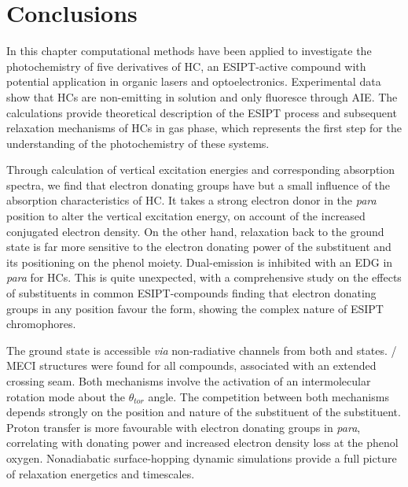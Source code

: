 \section{Conclusions}\label{section: NRdecay_Conclusions}
In this chapter computational methods have been applied to investigate the photochemistry of five derivatives of \ac{HC}, an ESIPT-active compound with potential application in organic lasers and optoelectronics. Experimental data show that \ac{HC}s are non-emitting in solution and only fluoresce through \ac{AIE}.\cite{Cheng2015} The calculations provide theoretical description of the ESIPT process and subsequent relaxation mechanisms of \ac{HC}s in gas phase, which represents the first step for the understanding of the photochemistry of these systems. 

Through calculation of vertical excitation energies and corresponding absorption spectra, we find that electron donating groups have but a small influence of the absorption characteristics of \ac{HC}. It takes a strong electron donor in the \textit{para} position to alter the vertical excitation energy, on account of the increased conjugated electron density. On the other hand, relaxation back to the ground state is far more sensitive to the electron donating power of the substituent and its positioning on the phenol moiety. Dual-emission is inhibited with an EDG in \textit{para} for \ac{HC}s. This is quite unexpected, with a comprehensive study on the effects of substituents in common ESIPT-compounds finding that electron donating groups in any position favour the \Estar{} form, showing the complex nature of ESIPT chromophores.\cite{Azarias2016}

The ground state is accessible \textit{via} non-radiative channels from both \Estar{} and \Kstar{} states. \sone/\szero{} MECI structures were found for all compounds, associated with an extended crossing seam. Both mechanisms involve the activation of an intermolecular rotation mode about the $\theta_{tor}$ angle. The competition between both mechanisms depends strongly on the position and nature of the substituent of the substituent. Proton transfer is more favourable with electron donating groups in \textit{para}, correlating with donating power and increased electron density loss at the phenol oxygen. Nonadiabatic surface-hopping dynamic simulations provide a full picture of relaxation energetics and timescales. 

